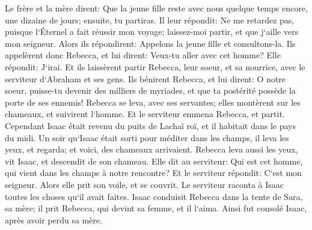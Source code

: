 \verse Le frère et la mère dirent: Que la jeune fille reste avec nous quelque temps encore, une dizaine de jours; ensuite, tu partiras. 
\verse Il leur répondit: Ne me retardez pas, puisque l`Éternel a fait réussir mon voyage; laissez-moi partir, et que j`aille vers mon seigneur. 
\verse Alors ils répondirent: Appelons la jeune fille et consultons-la. 
\verse Ils appelèrent donc Rebecca, et lui dirent: Veux-tu aller avec cet homme? Elle répondit: J`irai. 
\verse Et ils laissèrent partir Rebecca, leur soeur, et sa nourrice, avec le serviteur d`Abraham et ses gens. 
\verse Ils bénirent Rebecca, et lui dirent: O notre soeur, puisse-tu devenir des milliers de myriades, et que ta postérité possède la porte de ses ennemis! 
\verse Rebecca se leva, avec ses servantes; elles montèrent sur les chameaux, et suivirent l`homme. Et le serviteur emmena Rebecca, et partit. 
\verse Cependant Isaac était revenu du puits de Lachaï roï, et il habitait dans le pays du midi. 
\verse Un soir qu`Isaac était sorti pour méditer dans les champs, il leva les yeux, et regarda; et voici, des chameaux arrivaient. 
\verse Rebecca leva aussi les yeux, vit Isaac, et descendit de son chameau. 
\verse Elle dit au serviteur: Qui est cet homme, qui vient dans les champs à notre rencontre? Et le serviteur répondit: C`est mon seigneur. Alors elle prit son voile, et se couvrit. 
\verse Le serviteur raconta à Isaac toutes les choses qu`il avait faites. 
\verse Isaac conduisit Rebecca dans la tente de Sara, sa mère; il prit Rebecca, qui devint sa femme, et il l`aima. Ainsi fut consolé Isaac, après avoir perdu sa mère. 

